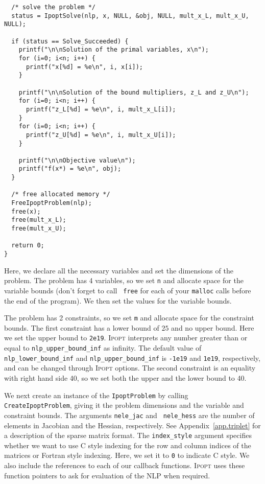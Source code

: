 \documentclass[10pt]{article}
\newcommand{\Ipopt}{\textsc{Ipopt}\xspace}
\begin{document}
\begin{footnotesize}
\begin{verbatim}
  /* solve the problem */
  status = IpoptSolve(nlp, x, NULL, &obj, NULL, mult_x_L, mult_x_U, NULL);

  if (status == Solve_Succeeded) {
    printf("\n\nSolution of the primal variables, x\n");
    for (i=0; i<n; i++) {
      printf("x[%d] = %e\n", i, x[i]); 
    }

    printf("\n\nSolution of the bound multipliers, z_L and z_U\n");
    for (i=0; i<n; i++) {
      printf("z_L[%d] = %e\n", i, mult_x_L[i]); 
    }
    for (i=0; i<n; i++) {
      printf("z_U[%d] = %e\n", i, mult_x_U[i]); 
    }

    printf("\n\nObjective value\n");
    printf("f(x*) = %e\n", obj); 
  }
 
  /* free allocated memory */
  FreeIpoptProblem(nlp);
  free(x);
  free(mult_x_L);
  free(mult_x_U);

  return 0;
}
\end{verbatim}
\end{footnotesize}

Here, we declare all the necessary variables and set the dimensions of
the problem.  The problem has 4 variables, so we set {\tt n} and
allocate space for the variable bounds (don't forget to call {\tt
  free} for each of your {\tt malloc} calls before the end of the
program). We then set the values for the variable bounds.

The problem has 2 constraints, so we set {\tt m} and allocate space
for the constraint bounds. The first constraint has a lower bound of
$25$ and no upper bound.  Here we set the upper bound to
\texttt{2e19}. \Ipopt interprets any number greater than or equal to
\texttt{nlp\_upper\_bound\_inf} as infinity. The default value of
\texttt{nlp\_lower\_bound\_inf} and \texttt{nlp\_upper\_bound\_inf} is
\texttt{-1e19} and \texttt{1e19}, respectively, and can be changed
through \Ipopt options.  The second constraint is an equality with
right hand side 40, so we set both the upper and the lower bound to
40.

We next create an instance of the {\tt IpoptProblem} by calling {\tt
CreateIpoptProblem}, giving it the problem dimensions and the variable
and constraint bounds. The arguments {\tt nele\_jac} and {\tt
nele\_hess} are the number of elements in Jacobian and the Hessian,
respectively. See Appendix~\ref{app.triplet} for a description of the
sparse matrix format. The {\tt index\_style} argument specifies whether
we want to use C style indexing for the row and column indices of the
matrices or Fortran style indexing. Here, we set it to {\tt 0} to
indicate C style.  We also include the references to each of our
callback functions. \Ipopt uses these function pointers to ask for
evaluation of the NLP when required.
\end{document}
